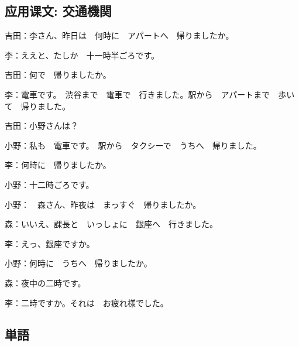 \subsection{应用课文: 交通機関}

吉田：李さん、昨日は　何時に　アパートへ　帰りましたか。

李：ええと、たしか　十一時半ごろです。

吉田：何で　帰りましたか。

李：電車です。　渋谷まで　電車で　行きました。駅から　アパートまで　歩いて　帰りました。

吉田：小野さんは？

小野：私も　電車です。　駅から　タクシーで　うちへ　帰りました。

李：何時に　帰りましたか。

小野：十二時ごろです。

\vspace{1em}

小野：　森さん、昨夜は　まっすぐ　帰りましたか。

森：いいえ、課長と　いっしょに　銀座へ　行きました。

李：えっ、銀座ですか。

小野：何時に　うちへ　帰りましたか。

森：夜中の二時です。

李：二時ですか。それは　お疲れ様でした。

\subsection{単語}

\begin{vocablist}[2]
\end{vocablist}
